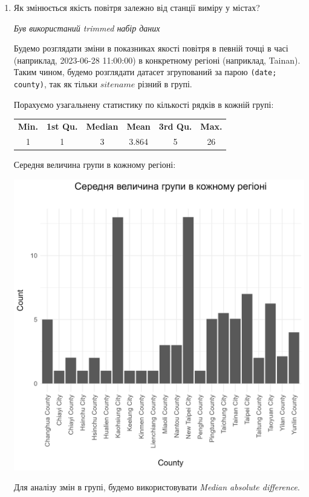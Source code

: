 \documentclass[./report.tex]{subfiles}
\begin{document}
\begin{enumerate}
  \pagebreak

  \item Як змінюється якість повітря залежно від станції виміру у містах?

  \quad \textit{Був використаний trimmed набір даних}

  Будемо розглядати зміни в показниках якості повітря в певній точці в часі (наприклад, 2023-06-28 11:00:00) в
  конкретному регіоні (наприклад, Tainan). Таким чином, будемо розглядати датасет
  згрупований за парою \verb|(date; county)|, так як тільки $sitename$ різний в групі.

  Порахуємо узагальнену статистику по кількості рядків в кожній групі:

  \begin{tabular}{cccccc}
    \textbf{Min.} & \textbf{1st Qu.}  & \textbf{Median} & \textbf{Mean} & \textbf{3rd Qu.} & \textbf{Max.} \\
    1 &  1  & 3 & 3.864 & 5 & 26 \\
  \end{tabular}

  Середня величина групи в кожному регіоні:

  \includegraphics[width=\linewidth]{plots/question7/bar-count.png}

  Для аналізу змін в групі, будемо використовувати \textit{Median absolute difference}.


\end{enumerate}
\end{document}

